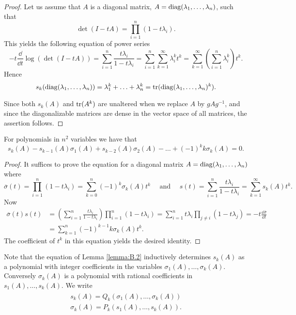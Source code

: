 \begin{proof}
  Let us assume that $A$ is a diagonal matrix, $A = \operatorname{diag}(\lambda_1, \ldots, \lambda_n)$, such that
  \[
    \det(I-tA) = \prod_{i=1}^n(1-t\lambda_i).
  \]
  This yields the following equation of power series 
  \[
    -t\frac{\dd }{\dd t}\log(\det(I-tA)) 
    = \sum_{i=1}^{n}{\frac{t\lambda_i}{1-t\lambda_i}}
    = \sum_{i=1}^{n}{\sum_{k=1}^{\infty }{\lambda_i^k t^k}}
    = \sum_{k=1}^{\infty }{\left(\sum_{i=1}^{n }{\lambda_i^k}\right)t^k}.
  \]
  Hence 
  \[
    s_k(\operatorname{diag}(\lambda_1, \ldots, \lambda_n)) 
    = \lambda_1^k + \ldots + \lambda_n^k
    = \mathrm{tr}(\operatorname{diag}(\lambda_1, \ldots, \lambda_n)^k).
  \]

  Since both $s_k(A)$ and $\mathrm{tr}(A^k)$ are unaltered when we replace $A$ by $gAg^{-1}$, and
  since the diagonalizable matrices are dense in the vector space of all matrices, the
  assertion follows.
\end{proof}

\begin{lemma}\label{lemma:B.2}
  For polynomials in $n^2$ variables we have that 
  \[
    s_k(A) - s_{k-1}(A)\sigma_1(A) + s_{k-2}(A)\sigma_2(A)
    - \ldots + (-1)^k k\sigma_k(A) = 0.
  \]
\end{lemma}


\begin{proof}
  It suffices to prove the equation for a diagonal matrix $A = \operatorname{diag}(\lambda_1, \ldots, \lambda_n)$ where
  \[
    \overline{\sigma}(t)
    = \prod_{i=1}^n (1-t\lambda_i)
    = \sum_{k=0}^{n }{(-1)^k\sigma_k(A)t^k}
    \quad \text{ and }\quad 
    s(t) = \sum_{i=1}^{n }{\frac{t\lambda_i }{1-t\lambda_i}}
    = \sum_{k=1}^{\infty }{s_k(A)t^k}.
  \]
  Now
  \begin{align*}
    \overline{\sigma}(t)s(t)
    & = \left(\sum_{i=1}^{n }{\frac{t\lambda_i }{1-t\lambda_i }}\right)\prod_{i=1}^n (1-t\lambda_i)
      = \sum_{i=1}^{n }{t\lambda_i \prod_{j\neq i }(1-t\lambda_j)} = -t\frac{\dd\overline{\sigma}}{\dd t}\\
    & = \sum_{k=1}^{n }{(-1)^{k-1}k\sigma_k(A)t^k}.
  \end{align*}
  The coefficient of $t^k$ in this equation yields the desired identity.
\end{proof}

Note that the equation of Lemma \ref{lemma:B.2} inductively determines $s_k(A)$ as a 
polynomial with integer coefficients in the variables $\sigma_1(A),\ldots, \sigma_k(A)$. Conversely
$\sigma_k(A)$ is a polynomial with rational coefficients in $s_1(A), \ldots, s_k(A)$. We write
\begin{align}\label{eq:B.2}
  \begin{matrix}
    s_k(A) = Q_k(\sigma_1(A),\ldots, \sigma_k(A)) \\
    \sigma_k(A) = P_k(s_1(A),\ldots, s_k(A)).
  \end{matrix}
\end{align}

